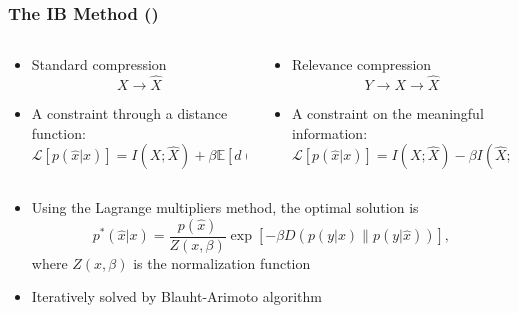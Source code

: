\documentclass[notes]{beamer}
\begin{document}
\begin{frame}
    \frametitle{The IB Method (\cite{IB-method})}
    \begin{columns}[T]
        \begin{column}{0.5\textwidth}
            \begin{itemize}
                \item Standard compression
                \begin{equation*}
                    X\to \hat{X}
                \end{equation*}
                \item A constraint through a distance function:
                \begin{equation*}
                    \mathcal{L}\left[p\left(\hat{x}|x\right)\right] \!=\! I(X;\hat{X}) + \beta \mathbb{E}\left[d\left(x,\hat{x}\right)\right]
                \end{equation*}
            \end{itemize}
        \end{column}
        \begin{column}{0.5\textwidth}
            \begin{itemize}
                \item Relevance compression
                \begin{equation*}
                    Y\to X\to \hat{X}
                \end{equation*}
                \item A constraint on the meaningful information:
                \begin{equation*}
                    \mathcal{L}\left[p\left(\hat{x}|x\right)\right] \!=\! I(X;\hat{X}) - \beta I(\hat{X};Y)
                \end{equation*}
            \end{itemize}
        \end{column}
    \end{columns}
    \hspace{1cm}
    \begin{itemize}
        \item Using the Lagrange multipliers method, the optimal solution is
        \begin{equation}
            p^*(\hat{x}|x) = \frac{p(\hat{x})}{Z(x, \beta)} \exp\left[-\beta D\left(p(y|x)\|p(y|\hat{x})\right)\right],
        \end{equation}
        where $Z(x, \beta)$ is the normalization function
        \item Iteratively solved by Blauht-Arimoto algorithm
    \end{itemize}
\end{frame}
\end{document}
